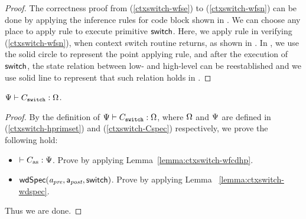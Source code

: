 {\begin{proof}
    The correctness proof from
    (\ref{ctxswitch-wfse}) to (\ref{ctxswitch-wfsn}) 
    can be done by applying the inference rules for 
    code block shown in 
    \Fig{\ref{fig:Selected Inference Rules for Refinement Verification}}. 
    We can choose any place to apply 
     rule to execute primitive $\mathsf{switch}$. 
    Here, we apply  rule 
    in verifying (\ref{ctxswitch-wfsn}), 
    when context switch routine returns, 
    as shown in \Fig{\ref{fig:refinement reasoning}}. 
    In \Fig{\ref{fig:refinement reasoning}}, we use the
    solid circle to represent the point applying  rule,
    and after the execution of $\mathsf{switch}$, the 
    state relation between low- and high-level can 
    be reestablished and we use solid line to represent 
    that such relation holds in \Fig{\ref{fig:refinement reasoning}}.

\end{proof}

\begin{theorem}
    \em
    ${\Psi} \vdash {C_{\texttt{switch}}} : {\Omega}$. 
\end{theorem}
\begin{proof}
    By the definition of 
    ${\Psi} \vdash {C_{\texttt{switch}}} : {\Omega}$, 
    where $\Omega$ and $\Psi{}$ are defined in 
    (\ref{ctxswitch-hprimset}) and (\ref{ctxswitch-Cspec}) 
    respectively, we prove the following hold:
    \begin{itemize}
        \item $\vdash {C_{\text{as}}} : {\Psi{}}$. 
            Prove by applying Lemma~\ref{lemma:ctxswitch-wfcdhp}.
        \item $\textsf{wdSpec}({\textit{a}_\textit{pre}}, {\mathsf{a}_{\textit{post}}}, {\mathsf{switch}})$.
            Prove by applying Lemma ~\ref{lemma:ctxswitch-wdspec}.
    \end{itemize}
    Thus we are done.
\end{proof}

}

